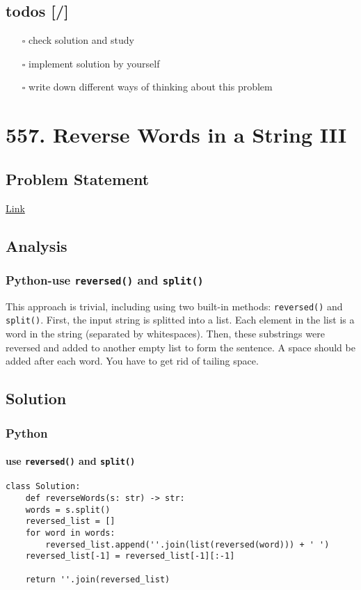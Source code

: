 \documentclass[11pt]{article}
\begin{document}
\subsection{todos [/]}
\label{sec:orgcaa0ead}
\begin{itemize}
\item[{$\square$}] check solution and study
\item[{$\square$}] implement solution by yourself
\item[{$\square$}] write down different ways of thinking about this problem
\end{itemize}
\section{557. Reverse Words in a String III}
\label{sec:org0d66b62}
\subsection{Problem Statement}
\label{sec:org6b27e0f}
\href{https://leetcode.com/problems/reverse-words-in-a-string-iii/}{Link}
\subsection{Analysis}
\label{sec:orgc66f511}
\subsubsection{Python-use \texttt{reversed()} and \texttt{split()}}
\label{sec:org3b15b1e}
This approach is trivial, including using two built-in methods: \texttt{reversed()} and \texttt{split()}. First, the input string is splitted into a list. Each element in the list is a word in the string (separated by whitespaces). Then, these substrings were reversed and added to another empty list to form the sentence. A space should be added after each word. You have to get rid of tailing space.
\subsection{Solution}
\label{sec:org550a72a}
\subsubsection{Python}
\label{sec:orgeb67db2}
\paragraph{use \texttt{reversed()} and \texttt{split()}}
\label{sec:orgd788b2a}
\begin{verbatim}
class Solution:
    def reverseWords(s: str) -> str:
	words = s.split()
	reversed_list = []
	for word in words:
	    reversed_list.append(''.join(list(reversed(word))) + ' ')
	reversed_list[-1] = reversed_list[-1][:-1]

	return ''.join(reversed_list)
\end{verbatim}
\end{document}
